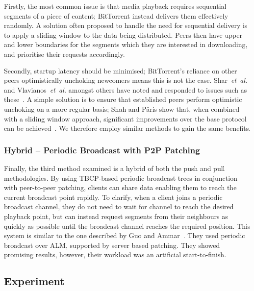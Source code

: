 Firstly, the most common issue is that media playback requires sequential segments of a piece of content; BitTorrent instead delivers them effectively randomly. A solution often proposed to handle the need for sequential delivery is to apply a sliding-window to the data being distributed. Peers then have upper and lower boundaries for the segments which they are interested in downloading, and prioritise their requests accordingly.

Secondly, startup latency should be minimised; BitTorrent's reliance on other peers optimistically unchoking newcomers means this is not the case. Shar~\emph{et~al.} and Vlavianos~\emph{et~al.} amongst others have noted and responded to issues such as these~\cite{shar07ppm,vlavianos06beb}. A simple solution is to ensure that established peers perform optimistic unchoking on a more regular basis; Shah and P\^{a}ris show that, when combined with a sliding window approach, significant improvements over the base protocol can be achieved~\cite{shar07ppm}. We therefore employ similar methods to gain the same benefits.

\subsubsection{Hybrid -- Periodic Broadcast with P2P Patching}

Finally, the third method examined is a hybrid of both the push and pull methodologies. By using TBCP-based periodic broadcast trees in conjunction with peer-to-peer patching, clients can share data enabling them to reach the current broadcast point rapidly. To clarify, when a client joins a periodic broadcast channel, they do not need to wait for channel to reach the desired playback point, but can instead request segments from their neighbours as quickly as possible until the broadcast channel reaches the required position. This system is similar to the one described by Guo and Ammar~\cite{guo2004slv}. They used periodic broadcast over ALM, supported by server based patching. They showed promising results, however, their workload was an artificial start-to-finish.

\subsection{Experiment}

